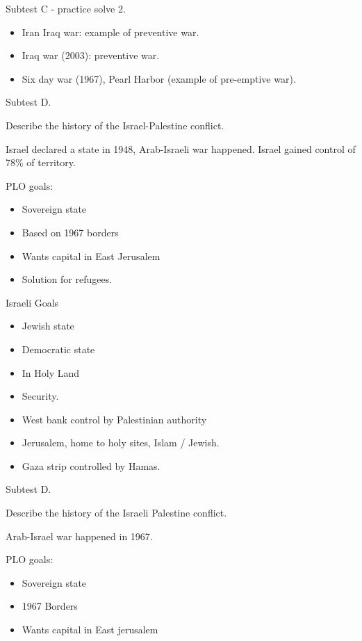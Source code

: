 \documentclass{article}
\begin{document}
  \newpage

  Subtest C - practice solve 2.

  \begin{itemize}
    \item Iran Iraq war: example of preventive war.
    \item Iraq war (2003): preventive war.
    \item Six day war (1967), Pearl Harbor (example of pre-emptive war).
  \end{itemize}


  Subtest D. 
 
  Describe the history of the Israel-Palestine conflict.

  Israel declared a state in 1948, Arab-Israeli war happened.  Israel gained control of 78\% of territory.

  PLO goals:

  \begin{itemize}
    \item Sovereign state
    \item Based on 1967 borders
    \item Wants capital in East Jerusalem
    \item Solution for refugees.
  \end{itemize}

  Israeli Goals
  \begin{itemize}
    \item Jewish state
    \item Democratic state
    \item In Holy Land
    \item Security.
  \end{itemize}


  \begin{itemize}
    \item West bank control by Palestinian authority
    \item Jerusalem, home to holy sites, Islam / Jewish.
    \item Gaza strip controlled by Hamas.
  \end{itemize}

  \newpage

  Subtest D.

  Describe the history of the Israeli Palestine conflict.

  Arab-Israel war happened in 1967.

  PLO goals:
  \begin{itemize}
    \item Sovereign state
    \item 1967 Borders
    \item Wants capital in East jerusalem
  \end{itemize}
\end{document}
